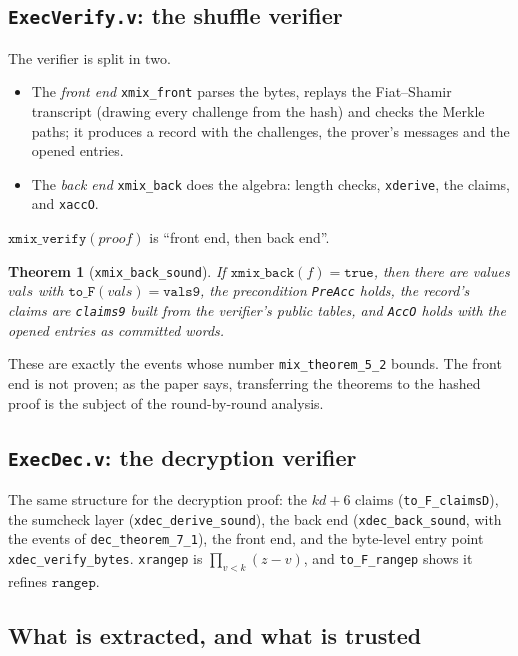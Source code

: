 \documentclass[11pt,a4paper]{article}
\theoremstyle{definition}
\theoremstyle{plain}
\newtheorem{theorem}[definition]{Theorem}
\begin{document}
\subsection{\texttt{ExecVerify.v}: the shuffle verifier}

The verifier is split in two.
\begin{itemize}[leftmargin=1.3em]
\item The \emph{front end} \texttt{xmix\_front} parses the bytes, replays the Fiat--Shamir transcript
  (drawing every challenge from the hash) and checks the Merkle paths; it produces a record with
  the challenges, the prover's messages and the opened entries.
\item The \emph{back end} \texttt{xmix\_back} does the algebra: length checks, \texttt{xderive}, the
  claims, and \texttt{xaccO}.
\end{itemize}
$\mathtt{xmix\_verify}(\mathit{proof})$ is ``front end, then back end''.
\begin{theorem}[\texttt{xmix\_back\_sound}]
If $\mathtt{xmix\_back}(f)=\mathtt{true}$, then there are values $\mathit{vals}$ with
$\mathtt{to\_F}(\mathit{vals})=\mathtt{vals9}$, the precondition \texttt{PreAcc} holds, the record's claims
are \texttt{claims9} built from the verifier's public tables, and \texttt{AccO} holds with the opened
entries as committed words.
\end{theorem}
These are exactly the events whose number \texttt{mix\_theorem\_5\_2} bounds. The front end is not
proven; as the paper says, transferring the theorems to the hashed proof is the subject of the
round-by-round analysis.

\subsection{\texttt{ExecDec.v}: the decryption verifier}

The same structure for the decryption proof: the $kd+6$ claims (\texttt{to\_F\_claimsD}), the sumcheck
layer (\texttt{xdec\_derive\_sound}), the back end (\texttt{xdec\_back\_sound}, with the events of
\texttt{dec\_theorem\_7\_1}), the front end, and the byte-level entry point
\texttt{xdec\_verify\_bytes}. \texttt{xrangep} is $\prod_{v<k}(z-v)$, and \texttt{to\_F\_rangep} shows it
refines $\mathtt{rangep}$.

\subsection{What is extracted, and what is trusted}
\end{document}
